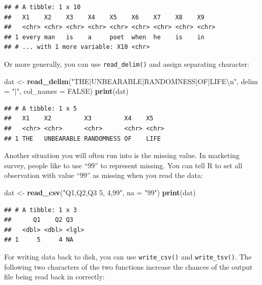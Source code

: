 \documentclass[12pt,]{krantz}
\makeatletter
\newenvironment{Shaded}{\begin{snugshade}}{\end{snugshade}}
\newcommand{\CharTok}[1]{\textcolor[rgb]{0.5,0.5,0.5}{#1}}
\newcommand{\DataTypeTok}[1]{\textcolor[rgb]{0.27,0.27,0.27}{#1}}
\newcommand{\KeywordTok}[1]{\textcolor[rgb]{0.27,0.27,0.27}{\textbf{#1}}}
\newcommand{\NormalTok}[1]{#1}
\newcommand{\OtherTok}[1]{\textcolor[rgb]{0.37,0.37,0.37}{#1}}
\newcommand{\StringTok}[1]{\textcolor[rgb]{0.5,0.5,0.5}{#1}}
\newenvironment{kframe}{%
\medskip{}
\setlength{\fboxsep}{.8em}
 \def\at@end@of@kframe{}%
 \ifinner\ifhmode%
  \def\at@end@of@kframe{\end{minipage}}%
  \begin{minipage}{\columnwidth}%
 \fi\fi%
 \def\FrameCommand##1{\hskip\@totalleftmargin \hskip-\fboxsep
 \colorbox{shadecolor}{##1}\hskip-\fboxsep
     \hskip-\linewidth \hskip-\@totalleftmargin \hskip\columnwidth}%
 \MakeFramed {\advance\hsize-\width
   \@totalleftmargin\z@ \linewidth\hsize
   \@setminipage}}%
 {\par\unskip\endMakeFramed%
 \at@end@of@kframe}
\renewenvironment{Shaded}{\begin{kframe}}{\end{kframe}}
\makeatother
\begin{document}
\begin{verbatim}
## # A tibble: 1 x 10
##   X1    X2    X3    X4    X5    X6    X7    X8    X9   
##   <chr> <chr> <chr> <chr> <chr> <chr> <chr> <chr> <chr>
## 1 every man   is    a     poet  when  he    is    in   
## # ... with 1 more variable: X10 <chr>
\end{verbatim}

Or more generally, you can use \texttt{read\_delim()} and assign separating character:

\begin{Shaded}
\begin{Highlighting}[]
\NormalTok{dat <-}\StringTok{ }\KeywordTok{read_delim}\NormalTok{(}\StringTok{"THE|UNBEARABLE|RANDOMNESS|OF|LIFE}\CharTok{\textbackslash{}n}\StringTok{"}\NormalTok{, }
    \DataTypeTok{delim =} \StringTok{"|"}\NormalTok{, }\DataTypeTok{col_names =} \OtherTok{FALSE}\NormalTok{)}
\KeywordTok{print}\NormalTok{(dat)}
\end{Highlighting}
\end{Shaded}

\begin{verbatim}
## # A tibble: 1 x 5
##   X1    X2         X3         X4    X5   
##   <chr> <chr>      <chr>      <chr> <chr>
## 1 THE   UNBEARABLE RANDOMNESS OF    LIFE
\end{verbatim}

Another situation you will often run into is the missing value. In marketing survey, people like to use ``99'' to represent missing. You can tell R to set all observation with value ``99'' as missing when you read the data:

\begin{Shaded}
\begin{Highlighting}[]
\NormalTok{dat <-}\StringTok{ }\KeywordTok{read_csv}\NormalTok{(}\StringTok{"Q1,Q2,Q3}
\StringTok{               5, 4,99"}\NormalTok{, }
               \DataTypeTok{na =} \StringTok{"99"}\NormalTok{)}
\KeywordTok{print}\NormalTok{(dat)}
\end{Highlighting}
\end{Shaded}

\begin{verbatim}
## # A tibble: 1 x 3
##      Q1    Q2 Q3   
##   <dbl> <dbl> <lgl>
## 1     5     4 NA
\end{verbatim}

For writing data back to disk, you can use \texttt{write\_csv()} and \texttt{write\_tsv()}. The following two characters of the two functions increase the chances of the output file being read back in correctly:
\end{document}

